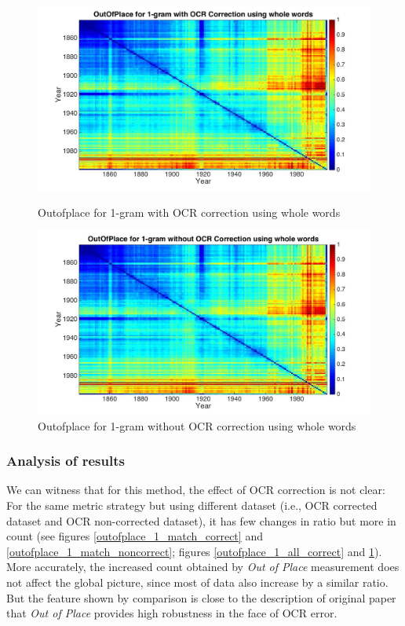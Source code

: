 \begin{figure}[H]
    \begin{minipage}[b]{0.48\linewidth}
        \includegraphics[scale=0.15]{Pictures/outofplace/outofplace_1-gram_correctedOCR_whole_words.jpg}
        \caption{Outofplace for 1-gram with OCR correction using whole words}
        \label{outofplace_1_all_correct}
    \end{minipage}\hfill
    \begin{minipage}[b]{0.5\linewidth}
        \includegraphics[scale=0.15]{Pictures/outofplace/outofplace_1-gram_noncorrectedOCR_whole_words.jpg}
        \caption{Outofplace for 1-gram without OCR correction using whole words}
        \label{outofplace_1_all_noncorrect}
    \end{minipage}\hfill
\end{figure}

\subsubsection{Analysis of results}

We can witness that for this method, the effect of OCR correction is not clear: For the same metric strategy but using different dataset (i.e., OCR corrected dataset and OCR non-corrected dataset), it has few changes in ratio but more in count (see figures \ref{outofplace_1_match_correct} and \ref{outofplace_1_match_noncorrect}; figures \ref{outofplace_1_all_correct} and \ref{outofplace_1_all_noncorrect}). More accurately, the increased count obtained by \emph{Out of Place} measurement does not affect the global picture, since most of data also increase by a similar ratio. But the feature shown by comparison is close to the description of original paper that \emph{Out of Place} provides high robustness in the face of OCR error.

